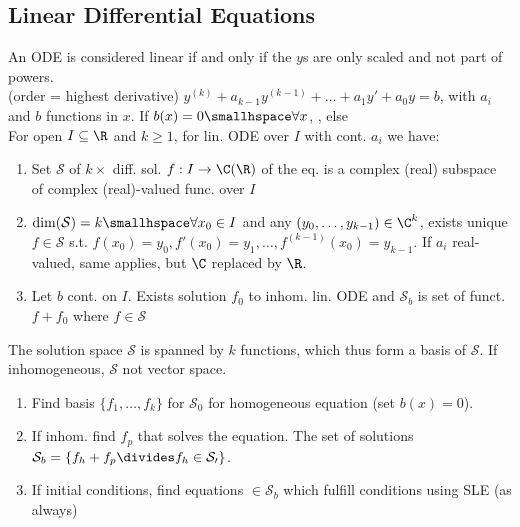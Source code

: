 \newsectionNoPB
\subsection{Linear Differential Equations}
An ODE is considered linear if and only if the $y$s are only scaled and not part of powers.\\
 (order = highest derivative)
$y^{(k)} + a_{k - 1}y^{(k - 1)} + \ldots + a_1 y' + a_0 y = b$, with $a_i$ and $b$ functions in $x$.
If $b(x) = 0 \smallhspace \forall x$, , else \\
%
\shorttheorem For open $I \subseteq \R$ and $k \geq 1$, for lin. ODE over $I$ with cont. $a_i$ we have:
\begin{enumerate}
    \item Set $\mathcal{S}$ of $k \times$ diff. sol. $f: I \rightarrow \C (\R)$ of the eq. is a complex (real) subspace of complex (real)-valued func. over $I$
    \item $\dim(\mathcal{S}) = k \smallhspace\forall x_0 \in I$ and any $(y_0, \ldots, y_{k - 1}) \in \C^k$, exists unique
          $f \in \mathcal{S}$ s.t. $f(x_0) = y_0, f'(x_0) = y_1, \ldots, f^{(k - 1)}(x_0) = y_{k - 1}$.
          If $a_i$ real-valued, same applies, but $\C$ replaced by $\R$.
    \item Let $b$ cont. on $I$. Exists solution $f_0$ to inhom. lin. ODE and $\mathcal{S}_b$ is set of funct. $f + f_0$ where $f \in \mathcal{S}$\\
\end{enumerate}
The solution space $\mathcal{S}$ is spanned by $k$ functions, which thus form a basis of $\mathcal{S}$. If inhomogeneous, $\mathcal{S}$ not vector space.

\begin{enumerate}[label=\bi{(\arabic*)}]
    \item Find basis $\{ f_1, \ldots, f_k \}$ for $\mathcal{S}_0$ for homogeneous equation (set $b(x) = 0$).
    \item If inhom. find $f_p$ that solves the equation. The set of solutions $\mathcal{S}_b = \{ f_h + f_p \divides f_h \in \mathcal{S_0} \}$.
    \item If initial conditions, find equations $\in \mathcal{S}_b$ which fulfill conditions using SLE (as always)
\end{enumerate}
